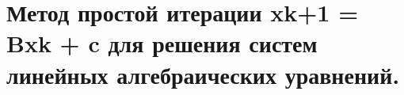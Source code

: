 \section{Метод простой итерации xk+1 = Bxk + c для решения систем линейных алгебраических уравнений.}
